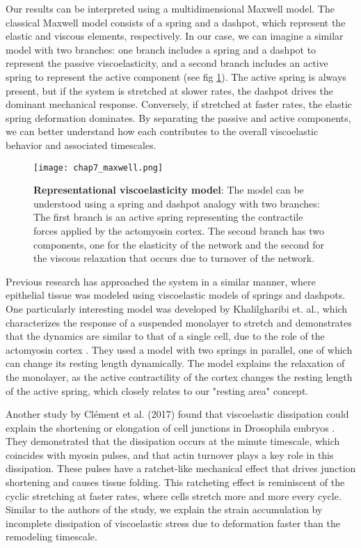 Our results can be interpreted using a multidimensional Maxwell model. The classical Maxwell model consists of a spring and a dashpot, which represent the elastic and viscous elements, respectively. In our case, we can imagine a similar model with two branches: one branch includes a spring and a dashpot to represent the passive viscoelasticity, and a second branch includes an active spring to represent the active component  (see fig \ref{fig_7_9}). The active spring is always present, but if the system is stretched at slower rates, the dashpot drives the dominant mechanical response. Conversely, if stretched at faster rates, the elastic spring deformation dominates. By separating the passive and active components, we can better understand how each contributes to the overall viscoelastic behavior and associated timescales. 

\begin{figure}[b!]
	\centering
	\texttt{[image: chap7\_maxwell.png]}
	\caption{\label{fig_7_9} \textbf{Representational viscoelasticity model}: The model can be understood using a spring and dashpot analogy with two branches: The first branch is an active spring representing the contractile forces applied by the actomyosin cortex. The second branch has two components, one for the elasticity of the network and the second for the viscous relaxation that occurs due to turnover of the network.
	}
\end{figure}

Previous research has approached the system in a similar manner, where epithelial tissue was modeled using viscoelastic models of springs and dashpots. One particularly interesting model was developed by Khalilgharibi et. al., which characterizes the response of a suspended monolayer to stretch and demonstrates that the dynamics are similar to that of a single cell, due to the role of the actomyosin cortex 
\cite{khalilgharibi2019}. They used a model with two springs in parallel, one of which can change its resting length dynamically. The model explains the relaxation of the monolayer, as the active contractility of the cortex changes the resting length of the active spring, which closely relates to our "resting area" concept. 

Another study by Clément et al. (2017) found that viscoelastic dissipation could explain the shortening or elongation of cell junctions in Drosophila embryos \cite{clement2017}. They demonstrated that the dissipation occurs at the minute timescale, which coincides with myosin pulses, and that actin turnover plays a key role in this dissipation. These pulses have a ratchet-like mechanical effect that drives junction shortening and causes tissue folding. This ratcheting effect is reminiscent of the cyclic stretching at faster rates, where cells stretch more and more every cycle. Similar to the authors of the study, we explain the strain accumulation by incomplete dissipation of viscoelastic stress due to deformation faster than the remodeling timescale.

